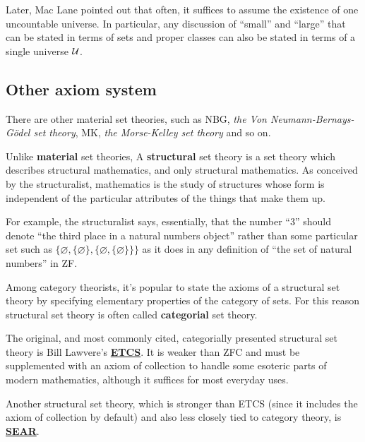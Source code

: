   Later, Mac Lane pointed out that often, it suffices to assume the existence of one uncountable universe. In particular, any discussion of ``small'' and ``large'' that can be stated in terms of sets and proper classes can also be stated in terms of a single universe ${\cal U}$.

\subsection{Other axiom system}
  There are other material set theories, such as NBG, \emph{the Von Neumann-Bernays-G\"{o}del set theory}, MK, \emph{the Morse-Kelley set theory} and so on.

  Unlike \textbf{material} set theories, A \textbf{structural} set theory is a set theory which describes structural mathematics, and only structural mathematics. As conceived by the structuralist, mathematics is the study of structures whose form is independent of the particular attributes of the things that make them up.

  For example, the structuralist says, essentially, that the number ``3'' should denote ``the third place in a natural numbers object'' rather than some particular set such as $\{\varnothing,\{\varnothing\},\{\varnothing,\{\varnothing\}\}\}$ as it does in any definition of ``the set of natural numbers'' in ZF.

  Among category theorists, it's popular to state the axioms of a structural set theory by specifying elementary properties of the category of sets. For this reason structural set theory is often called \textbf{categorial} set theory.

  The original, and most commonly cited, categorially presented structural set theory is Bill Lawvere's \href{http://ncatlab.org/nlab/show/ETCS}{\textbf{ETCS}}. It is weaker than ZFC and must be supplemented with an axiom of collection to handle some esoteric parts of modern mathematics, although it suffices for most everyday uses.

  Another structural set theory, which is stronger than ETCS (since it includes the axiom of collection by default) and also less closely tied to category theory, is \href{http://ncatlab.org/nlab/show/SEAR}{\textbf{SEAR}}.
